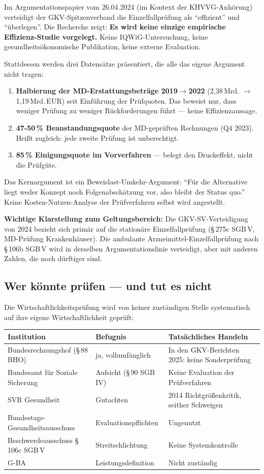 \documentclass{umbruch-position}
\begin{document}
Im Argumentationspapier vom 26.04.2024 (im Kontext der KHVVG-Anhörung) verteidigt der GKV-Spitzenverband die Einzelfallprüfung als ``effizient'' und ``überlegen''. Die Recherche zeigt: \textbf{Es wird keine einzige empirische Effizienz-Studie vorgelegt.} Keine IQWiG-Untersuchung, keine gesundheitsökonomische Publikation, keine externe Evaluation.

Stattdessen werden drei Datensätze präsentiert, die alle das eigene Argument nicht tragen:

\begin{enumerate}
  \item \textbf{Halbierung der MD-Erstattungsbeträge 2019$\to$2022} (2,38\,Mrd. $\to$ 1,19\,Mrd.\,EUR) seit Einführung der Prüfquoten. Das beweist nur, dass weniger Prüfung zu weniger Rückforderungen führt --- keine Effizienzaussage.
  \item \textbf{47-50\,\% Beanstandungsquote} der MD-geprüften Rechnungen (Q4 2023). Heißt zugleich: jede zweite Prüfung ist unberechtigt.
  \item \textbf{85\,\% Einigungsquote im Vorverfahren} --- belegt den Druckeffekt, nicht die Prüfgüte.
\end{enumerate}

Das Kernargument ist ein Beweislast-Umkehr-Argument: ``Für die Alternative liegt weder Konzept noch Folgenabschätzung vor, also bleibt der Status quo.'' Keine Kosten-Nutzen-Analyse der Prüfverfahren selbst wird angestellt.

\textbf{Wichtige Klarstellung zum Geltungsbereich:} Die GKV-SV-Verteidigung von 2024 bezieht sich primär auf die stationäre Einzelfallprüfung (\S\,275c SGB\,V, MD-Prüfung Krankenhäuser). Die ambulante Arzneimittel-Einzelfallprüfung nach \S\,106b SGB\,V wird in derselben Argumentationslinie verteidigt, aber mit anderen Zahlen, die noch dürftiger sind.

\subsection{Wer könnte prüfen --- und tut es nicht}

Die Wirtschaftlichkeitsprüfung wird von keiner zuständigen Stelle systematisch auf ihre eigene Wirtschaftlichkeit geprüft:

{\small
\begin{tabularx}{\textwidth}{X X X}
\toprule
\textbf{Institution} & \textbf{Befugnis} & \textbf{Tatsächliches Handeln} \\
\midrule
Bundesrechnungshof (\S\,88 BHO) & ja, vollumfänglich & In den GKV-Berichten 2025: keine Sonderprüfung \\
Bundesamt für Soziale Sicherung & Aufsicht (\S\,90 SGB IV) & Keine Evaluation der Prüfverfahren \\
SVR Gesundheit & Gutachten & 2014 Richtgrößenkritik, seither Schweigen \\
Bundestags-Gesundheitsausschuss & Evaluationspflichten & Ungenutzt \\
Beschwerdeausschuss \S\,106c SGB\,V & Streitschlichtung & Keine Systemkontrolle \\
G-BA & Leistungsdefinition & Nicht zuständig \\
\bottomrule
\end{tabularx}
}
\end{document}
